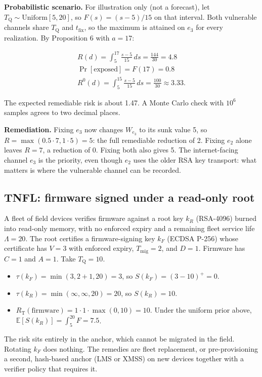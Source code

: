 \documentclass[conference]{IEEEtran}
\newcommand{\Tq}{T_{\mathrm{Q}}}
\newcommand{\tfix}{t_{\mathrm{fix}}}
\providecommand{\E}{}\renewcommand{\E}{\mathbb{E}}
\begin{document}
\textbf{Probabilistic scenario.} For illustration only (not a forecast), let $\Tq \sim \mathrm{Uniform}[5, 20]$, so $F(s) = (s - 5)/15$ on that interval. Both vulnerable channels share $\Tq$ and $\tfix$, so the maximum is attained on $e_3$ for every realization. By Proposition 6 with $a = 17$:

\begin{gather*}
R(d) = \int_5^{17} \tfrac{s-5}{15}\,ds = \tfrac{144}{30} = 4.8 \\
\Pr[\text{exposed}] = F(17) = 0.8 \\
R^0(d) = \int_5^{15} \tfrac{s-5}{15}\,ds = \tfrac{100}{30} \approx 3.33.
\end{gather*}

The expected remediable risk is about 1.47. A Monte Carlo check with $10^6$ samples agrees to two decimal places.

\textbf{Remediation.} Fixing $e_3$ now changes $W_{e_3}$ to its sunk value 5, so $R = \max(0.5 \cdot 7, 1 \cdot 5) = 5$: the full remediable reduction of 2. Fixing $e_2$ alone leaves $R = 7$, a reduction of 0. Fixing both also gives 5. The internet-facing channel $e_3$ is the priority, even though $e_2$ uses the older RSA key transport: what matters is where the vulnerable channel can be recorded.

\subsection{TNFL: firmware signed under a read-only root}\label{sec:10.2}

A fleet of field devices verifies firmware against a root key $k_R$ (RSA-4096) burned into read-only memory, with no enforced expiry and a remaining fleet service life $\Lambda = 20$. The root certifies a firmware-signing key $k_F$ (ECDSA P-256) whose certificate has $V = 3$ with enforced expiry, $T_{\mathrm{mig}} = 2$, and $D = 1$. Firmware has $C = 1$ and $A = 1$. Take $\Tq = 10$.

\begin{itemize}
\item $\tau(k_F) = \min(3, 2 + 1, 20) = 3$, so $S(k_F) = (3 - 10)^+ = 0$.
\item $\tau(k_R) = \min(\infty, \infty, 20) = 20$, so $S(k_R) = 10$.
\item $R_{\mathrm{T}}(\text{firmware}) = 1 \cdot 1 \cdot \max(0, 10) = 10$. Under the uniform prior above, $\E[S(k_R)] = \int_5^{20} F = 7.5$.
\end{itemize}

The risk sits entirely in the anchor, which cannot be migrated in the field. Rotating $k_F$ does nothing. The remedies are fleet replacement, or pre-provisioning a second, hash-based anchor (LMS or XMSS) on new devices together with a verifier policy that requires it.
\end{document}
